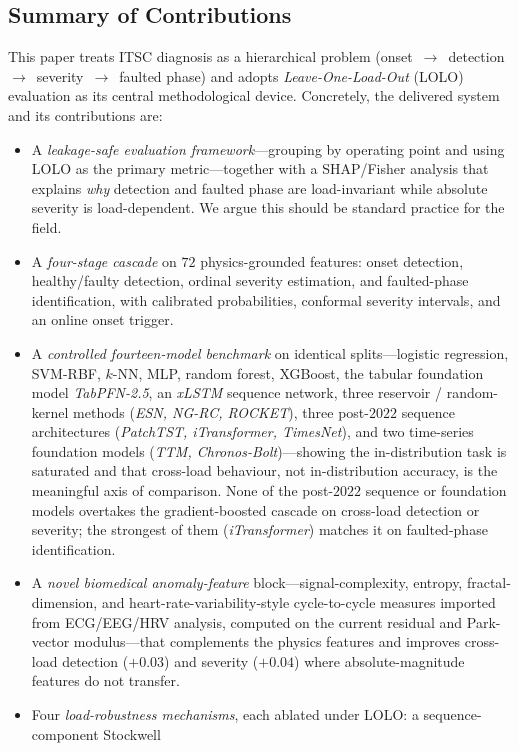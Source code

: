 \documentclass[journal]{IEEEtran}
\begin{document}
\subsection{Summary of Contributions}
This paper treats ITSC diagnosis as a hierarchical problem
(onset~$\rightarrow$~detection~$\rightarrow$~severity~$\rightarrow$~faulted phase) and adopts
\emph{Leave-One-Load-Out} (LOLO) evaluation as its central methodological device. Concretely, the
delivered system and its contributions are:
\begin{itemize}
\item A \emph{leakage-safe evaluation framework}---grouping by operating point and using LOLO as the
primary metric---together with a SHAP/Fisher analysis that explains \emph{why} detection and faulted
phase are load-invariant while absolute severity is load-dependent. We argue this should be standard
practice for the field.
\item A \emph{four-stage cascade} on $72$ physics-grounded features: onset detection, healthy/faulty
detection, ordinal severity estimation, and faulted-phase identification, with calibrated probabilities,
conformal severity intervals, and an online onset trigger.
\item A \emph{controlled fourteen-model benchmark} on identical splits---logistic regression,
SVM-RBF, $k$-NN, MLP, random forest, XGBoost, the tabular foundation model
\emph{TabPFN-2.5}, an \emph{xLSTM} sequence network, three reservoir / random-kernel methods
(\emph{ESN, NG-RC, ROCKET}), three post-$2022$ sequence architectures
(\emph{PatchTST, iTransformer, TimesNet}), and two time-series foundation models
(\emph{TTM, Chronos-Bolt})---showing the in-distribution task is saturated and that
cross-load behaviour, not in-distribution accuracy, is the meaningful axis of comparison.
None of the post-$2022$ sequence or foundation models overtakes the gradient-boosted
cascade on cross-load detection or severity; the strongest of them (\emph{iTransformer})
matches it on faulted-phase identification.
\item A \emph{novel biomedical anomaly-feature} block---signal-complexity, entropy, fractal-dimension,
and heart-rate-variability-style cycle-to-cycle measures imported from ECG/EEG/HRV analysis, computed on
the current residual and Park-vector modulus---that complements the physics features and improves
cross-load detection ($+0.03$) and severity ($+0.04$) where absolute-magnitude features do not transfer.
\item Four \emph{load-robustness mechanisms}, each ablated under LOLO: a sequence-component Stockwell

\end{itemize}
\end{document}
